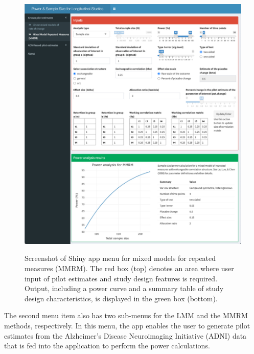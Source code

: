 \begin{figure}[ht]
	\includegraphics[width=14cm]{Figures/MMRM-screenshot.pdf}\\
	\caption{Screenshot of Shiny app menu for mixed models for repeated measures (MMRM). The red box (top) denotes an area where user input of pilot estimates and study design features is required. Output, including a power curve and a summary table of study design characteristics, is displayed in the green box (bottom).}\label{MMRMinput}
\end{figure}


The second menu item also has two sub-menus for the LMM and the MMRM methods, respectively. In this menu, the app enables the user to generate pilot estimates from the Alzheimer's Disease Neuroimaging Initiative (ADNI) data that is fed into the application to perform the power calculations. 

